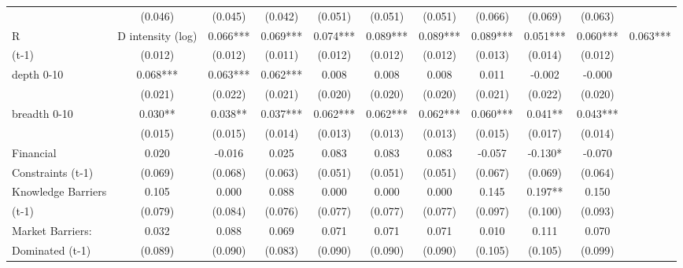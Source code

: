 \begin{table}[htbp]
\begin{tabular}{l*{9}{c}}
                    &     (0.046)   &     (0.045)   &     (0.042)   &     (0.051)   &     (0.051)   &     (0.051)   &     (0.066)   &     (0.069)   &     (0.063)   \\
R&D intensity (log) &       0.066***&       0.069***&       0.074***&       0.089***&       0.089***&       0.089***&       0.051***&       0.060***&       0.063***\\
(t-1)               &     (0.012)   &     (0.012)   &     (0.011)   &     (0.012)   &     (0.012)   &     (0.012)   &     (0.013)   &     (0.014)   &     (0.012)   \\
depth 0-10          &       0.068***&       0.063***&       0.062***&       0.008   &       0.008   &       0.008   &       0.011   &      -0.002   &      -0.000   \\
                    &     (0.021)   &     (0.022)   &     (0.021)   &     (0.020)   &     (0.020)   &     (0.020)   &     (0.021)   &     (0.022)   &     (0.020)   \\
breadth 0-10        &       0.030** &       0.038** &       0.037***&       0.062***&       0.062***&       0.062***&       0.060***&       0.041** &       0.043***\\
                    &     (0.015)   &     (0.015)   &     (0.014)   &     (0.013)   &     (0.013)   &     (0.013)   &     (0.015)   &     (0.017)   &     (0.014)   \\
Financial           &       0.020   &      -0.016   &       0.025   &       0.083   &       0.083   &       0.083   &      -0.057   &      -0.130*  &      -0.070   \\
Constraints (t-1)   &     (0.069)   &     (0.068)   &     (0.063)   &     (0.051)   &     (0.051)   &     (0.051)   &     (0.067)   &     (0.069)   &     (0.064)   \\
Knowledge Barriers  &       0.105   &       0.000   &       0.088   &       0.000   &       0.000   &       0.000   &       0.145   &       0.197** &       0.150   \\
(t-1)               &     (0.079)   &     (0.084)   &     (0.076)   &     (0.077)   &     (0.077)   &     (0.077)   &     (0.097)   &     (0.100)   &     (0.093)   \\
Market Barriers:    &       0.032   &       0.088   &       0.069   &       0.071   &       0.071   &       0.071   &       0.010   &       0.111   &       0.070   \\
Dominated (t-1)     &     (0.089)   &     (0.090)   &     (0.083)   &     (0.090)   &     (0.090)   &     (0.090)   &     (0.105)   &     (0.105)   &     (0.099)   \\

\end{tabular}
\end{table}
